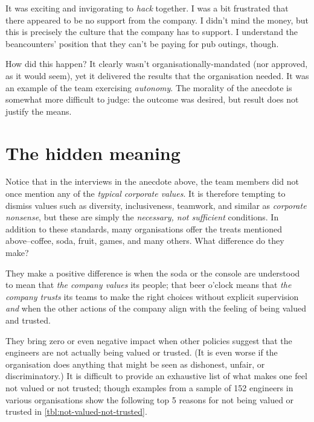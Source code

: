 \begin{example}
It was exciting and invigorating to \emph{hack} together. I was a bit frustrated that there appeared to be no support from the company. I didn't mind the money, but this is precisely the culture that the company has to support. I understand the beancounters' position that they can't be paying for pub outings, though.
\end{example}

How did this happen? It clearly wasn't organisationally-mandated (nor approved, as it would seem), yet it delivered the results that the organisation needed. It was an example of the team exercising \emph{autonomy}. The morality of the anecdote is somewhat more difficult to judge: the outcome was desired, but result does not justify the means\cite{why-value-autonomy}.

\section{The hidden meaning}
Notice that in the interviews in the anecdote above, the team members did not once mention any of the \emph{typical corporate values}. It is therefore tempting to dismiss values such as diversity, inclusiveness, teamwork, and similar as \emph{corporate nonsense}, but these are simply the \emph{necessary, not sufficient} conditions. In addition to these standards, many organisations offer the treats mentioned above--coffee, soda, fruit, games, and many others. What difference do they make?

They make a positive difference is when the soda or the console are understood to mean that \emph{the company values} its people; that beer o'clock means that \emph{the company trusts} its teams to make the right choices without explicit supervision \emph{and} when the other actions of the company align with the feeling of being valued and trusted\cite{joel-on-software}.

They bring zero or even negative impact when other policies suggest that the engineers are not actually being valued or trusted. (It is even worse if the organisation does anything that might be seen as dishonest, unfair, or discriminatory.) It is difficult to provide an exhaustive list of what makes one feel not valued or not trusted; though examples from a sample of 152 engineers in various organisations show the following top 5 reasons for not being valued or trusted in \autoref{tbl:not-valued-not-trusted}.

